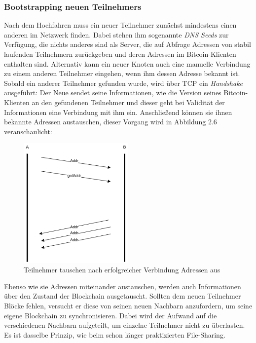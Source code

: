 \subsubsection{Bootstrapping neuen Teilnehmers}
Nach dem Hochfahren muss ein neuer Teilnehmer zunächst mindestens einen anderen im Netzwerk finden. Dabei stehen ihm sogenannte \emph{DNS Seeds} zur Verfügung, die nichts anderes sind als Server, die auf Abfrage Adressen von stabil laufenden Teilnehmern zurückgeben und deren Adressen im Bitcoin-Klienten enthalten sind. 
Alternativ kann ein neuer Knoten auch eine manuelle Verbindung zu einem anderen Teilnehmer eingehen, wenn ihm dessen Adresse bekannt ist.\\
Sobald ein anderer Teilnehmer gefunden wurde, wird über TCP ein \emph{Handshake} ausgeführt: Der Neue sendet seine Informationen, wie die Version seines Bitcoin-Klienten an den gefundenen Teilnehmer und dieser geht bei Validität der Informationen eine Verbindung mit ihm ein.
Anschließend können sie ihnen bekannte Adressen austauschen, dieser Vorgang wird in Abbildung 2.6 veranschaulicht:
\begin{figure}[htpb]
	\centering
	\includegraphics[width=0.5\textwidth]{images/adress_query.png}
	\caption{Teilnehmer tauschen nach erfolgreicher Verbindung Adressen aus}
	\label{6braun:fig:adress_query}
\end{figure}

Ebenso wie sie Adressen miteinander austauschen, werden auch Informationen über den Zustand der Blockchain ausgetauscht. Sollten dem neuen Teilnehmer Blöcke fehlen, versucht er diese von seinen neuen Nachbarn anzufordern, um seine eigene Blockchain zu synchronisieren. Dabei wird der Aufwand auf die verschiedenen Nachbarn aufgeteilt, um einzelne Teilnehmer nicht zu überlasten. Es ist dasselbe Prinzip, wie beim schon länger praktizierten File-Sharing.
